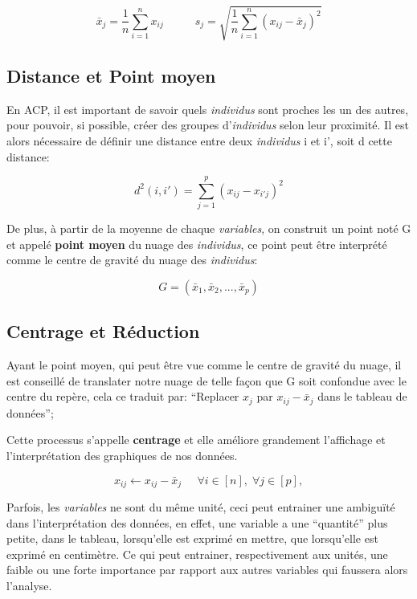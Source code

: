 \documentclass{article}
\begin{document}
\begin{equation*}
\bar{x}_j=\frac{1}{n}\sum_{i=1}^{n}{x_{ij}} \;\;\;\;\;\;\;\;\;\; s_j=\sqrt{\frac{1}{n}\sum_{i=1}^{n}{(x_{ij}-\bar{x}_j)^2}}
\end{equation*}

\subsection{Distance et Point moyen}
En ACP, il est important de savoir quels \textit{individus} sont proches les un des autres, pour pouvoir, si possible, créer des groupes d'\textit{individus} selon leur proximité. Il est alors nécessaire de définir une distance entre deux \textit{individus} i et i', soit d cette distance:

\begin{equation*}
d^2(i,i')=\sum_{j=1}^{p}{(x_{ij}-x_{i'j})^2} 
\end{equation*}

\newpage

De plus, à partir de la moyenne de chaque \textit{variables}, on construit un point noté G et appelé \textbf{point moyen} du nuage des \textit{individus}, ce point peut être interprété comme le centre de gravité du nuage des \textit{individus}:

\begin{equation*}
G=(\bar{x}_1,\bar{x}_2,...,\bar{x}_p)
\end{equation*}

\subsection{Centrage et Réduction}
Ayant le point moyen, qui peut être vue comme le centre de gravité du nuage, il est conseillé de translater notre nuage de telle façon que G soit confondue avec le centre du repère, cela ce traduit par: ``Replacer $x_j$ par $x_{ij}-\bar{x}_j$ dans le tableau de données'';
\newline

Cette processus s'appelle \textbf{centrage} et elle améliore grandement l'affichage et l'interprétation des graphiques de nos données.

\begin{equation*}
x_{ij} \leftarrow x_{ij}-\bar{x}_j \;\;\;\;\; \forall i \in [n], \; \forall j \in [p],
\end{equation*}
\newline

Parfois, les \textit{variables} ne sont du même unité, ceci peut entrainer une ambiguïté dans l'interprétation des données, en effet, une variable a une ``quantité'' plus petite, dans le tableau, lorsqu'elle est exprimé en mettre, que lorsqu'elle est exprimé en centimètre. Ce qui peut entrainer, respectivement aux unités, une faible ou une forte importance par rapport aux autres variables qui faussera alors l'analyse.
\newline
\end{document}
